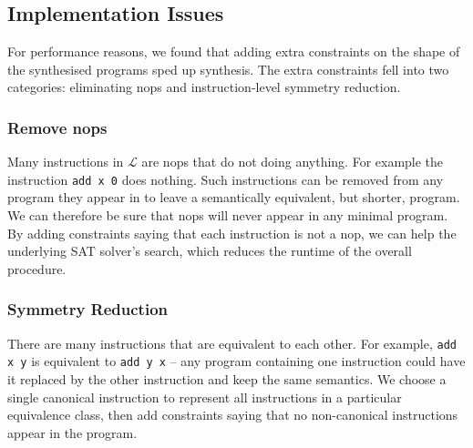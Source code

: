 \documentclass[a4paper]{llncs}
\begin{document}
\subsection{Implementation Issues}
For performance reasons, we found that adding extra constraints on the
shape of the synthesised programs sped up synthesis.  The extra constraints
fell into two categories: eliminating nops and instruction-level symmetry reduction.

\subsubsection{Remove nops}
Many instructions in $\mathcal{L}$ are nops that do not doing anything.
For example the instruction \verb|add x 0| does nothing.  Such instructions
can be removed from any program they appear in to leave a semantically
equivalent, but shorter, program.  We can therefore be sure that nops
will never appear in any minimal program.  By adding constraints saying that
each instruction is not a nop, we can help the underlying SAT solver's
search, which reduces the runtime of the overall procedure.

\subsubsection{Symmetry Reduction}
There are many instructions that are equivalent to each other.  For example,
\verb|add x y| is equivalent to \verb|add y x| -- any program containing
one instruction could have it replaced by the other instruction and
keep the same semantics.  We choose a single canonical instruction to
represent all instructions in a particular equivalence class, then add
constraints saying that no non-canonical instructions appear in the program.

\iffalse
Our rules for excluding non-canonical instructions are:

\begin{itemize}
 \item For commutative operations, the first operand is smaller than the second.
 \item For unary operations, the second (unused) operand is always 0.
 \item No instruction may have two constant operands.
 \item All constants in the constant table are distinct.
\end{itemize}

As with the nop constraints, these additional constraints do increase the
size of the resulting SAT instance, but this still ends up as a win in
terms of runtime.
\fi
\end{document}
